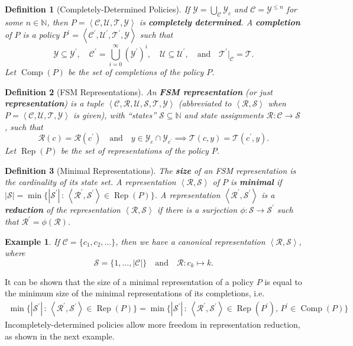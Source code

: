 \documentclass[a4paper,10pt]{article}
\def\1{^{\prime}}
\def\T{\mathcal{T}}
\def\Y{\mathcal{Y}}
\def\C{\mathcal{C}}
\def\U{\mathcal{U}}
\def\R{\mathcal{R}}
\def\S{\mathcal{S}}
\def\NN{\mathbb{N}}
\def\ang#1{\left\langle#1\right\rangle}
\def\qtx#1{\quad\text{#1}\quad}
\def\Rep{\operatorname{Rep}}
\def\Comp{\operatorname{Comp}}
\newtheorem{example}{Example}
\newtheorem{definition}{Definition}
\begin{document}
\begin{definition}[Completely-Determined Policies]
If $\Y=\bigcup_\C\Y_c$ and $\C=\Y^{\leq n}$ for some $n\in\NN$, then $P=\ang{\C,\U,\T,\Y}$ is \textbf{completely determined}.
A \textbf{completion} of $P$ is a policy $P\1=\ang{\C\1, \U\1, \T\1, \Y}$ such that
\begin{equation}
\Y\subseteq\Y\1,\quad \C\1=\bigcup_{i=0}^{\infty}(\Y\1)^i,\quad \U\subseteq\U\1, \qtx{and} \T\1|_{\C} = \T.
\end{equation}
Let $\Comp(P)$ be the set of completions of the policy $P$.
\end{definition}
\begin{definition}[FSM Representations]
An \textbf{FSM representation} (or just \textbf{representation})
is a tuple $\ang{\C,\R,\U,\S,\T,\Y}$ (abbreviated to $\ang{\R,\S}$ when $P=\ang{\C,\U,\T,\Y}$ is given), 
with ``states'' $\S\subseteq\NN$ and state assignments $\R:\C\to\S$, such that 
\begin{equation}
\R(c)=\R(c\1)\qtx{and}y\in\Y_c\cap\Y_{c\1}\implies\T(c,y)=\T(c\1,y).
\end{equation} 
Let $\Rep(P)$ be the set of representations of the policy $P$.  
\end{definition}
\begin{definition}[Minimal Representations]
The \textbf{size} of an FSM representation is the cardinality of its state set.  
A representation $\ang{\R,\S}$ of $P$ is \textbf{minimal} if 
$|\S|=\min\{|\S\1|\,:\,\ang{\R\1,\S\1}\in\Rep(P)\}$.
A representation $\ang{\R\1,\S\1}$ is a \textbf{reduction} of the representation $\ang{\R,\S}$ if there is a surjection $\phi:\S\to\S\1$
such that $\R\1 = \phi(\R)$.
\end{definition}
\begin{example}
\label{ex:canon}
If $\C = \{c_1, c_2, \ldots\}$, then 
we have a canonical representation $\ang{\R,\S}$, where
\begin{equation}
\S=\{1,\ldots,|\C|\}\qtx{and}\R:c_k\mapsto k.
\end{equation} 
\end{example}
It can be shown that the size of a minimal representation of a policy $P$ is equal to the minimum
size of the minimal representations of its completions, i.e.
\begin{align}
\min\{|\S\1|\,:\,\ang{\R\1,\S\1}\in\Rep(P)\} = \min\{|\S\1|\,:\,\ang{\R\1,\S\1}\in\Rep(P\1),\,P\1\in\Comp(P)\}
\end{align}
Incompletely-determined policies allow more freedom in representation reduction, as shown in the next example.
\end{document}
